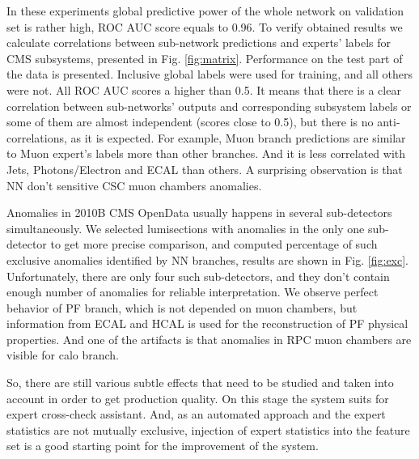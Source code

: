 \documentclass[a4paper]{jpconf}
\begin{document}
In these experiments global predictive power of the whole network on validation set is rather high, ROC AUC score equals to 0.96.
To verify obtained results we calculate correlations between sub-network predictions and experts' labels for CMS subsystems, presented in Fig. \ref{fig:matrix}. Performance on the test part of the data is presented. Inclusive global labels were used for training, and all others were not. All ROC AUC scores a higher than 0.5. It means that there is a clear correlation between sub-networks’ outputs and corresponding subsystem labels or some of them are almost independent (scores close to 0.5), but there is no anti-correlations, as it is expected. For example, Muon branch predictions are similar to Muon expert's labels more than other branches. And it is less correlated with Jets, Photons/Electron and ECAL than others. A surprising observation is that NN don't sensitive CSC muon chambers anomalies. 

Anomalies in 2010B CMS OpenData usually happens in several sub-detectors simultaneously. We selected lumisections with anomalies in the only one sub-detector to get more precise comparison, and computed percentage of such exclusive anomalies identified by NN branches, results are shown in Fig. \ref{fig:exc}. Unfortunately, there are only four such sub-detectors, and they don't contain enough number of anomalies for reliable interpretation. We observe perfect behavior of PF branch, which is not depended on muon chambers, but information from ECAL and HCAL is used for the reconstruction of PF physical properties. And one of the artifacts is that anomalies in RPC muon chambers are visible for calo branch.

So, there are still various subtle effects that need to be studied and taken into account in order to get production quality. On this stage the system suits for expert cross-check assistant.
And, as an automated approach and the expert statistics are not
mutually exclusive, injection of expert statistics into the feature set is a good starting point for the improvement of the system.
\end{document}
